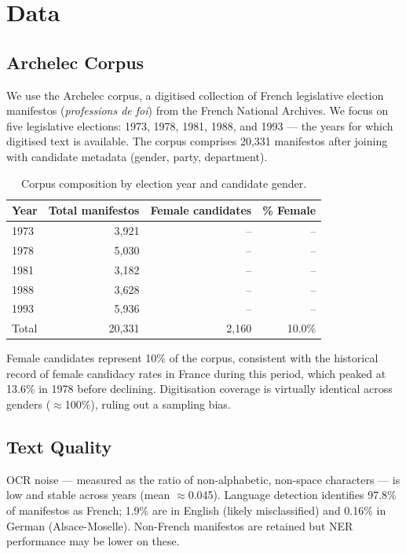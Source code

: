 \documentclass{article}
\begin{document}
\section{Data}

\subsection{Archelec Corpus}

We use the Archelec corpus, a digitised collection of French legislative election
manifestos (\emph{professions de foi}) from the French National Archives. We focus
on five legislative elections: 1973, 1978, 1981, 1988, and 1993 — the years for
which digitised text is available. The corpus comprises 20,331 manifestos after
joining with candidate metadata (gender, party, department).

\begin{table}[h]
  \caption{Corpus composition by election year and candidate gender.}
  \label{tab:corpus}
  \centering
  \begin{tabular}{lrrr}
    \toprule
    Year & Total manifestos & Female candidates & \% Female \\
    \midrule
    1973 & 3,921 & -- & -- \\
    1978 & 5,030 & -- & -- \\
    1981 & 3,182 & -- & -- \\
    1988 & 3,628 & -- & -- \\
    1993 & 5,936 & -- & -- \\
    \midrule
    Total & 20,331 & 2,160 & 10.0\% \\
    \bottomrule
  \end{tabular}
\end{table}

Female candidates represent 10\% of the corpus, consistent with the historical
record of female candidacy rates in France during this period, which peaked at
13.6\% in 1978 before declining. Digitisation coverage is virtually identical
across genders ($\approx$100\%), ruling out a sampling bias.

\subsection{Text Quality}

OCR noise — measured as the ratio of non-alphabetic, non-space characters — is
low and stable across years (mean $\approx$0.045). Language detection identifies
97.8\% of manifestos as French; 1.9\% are in English (likely misclassified) and
0.16\% in German (Alsace-Moselle). Non-French manifestos are retained but NER
performance may be lower on these.
\end{document}
